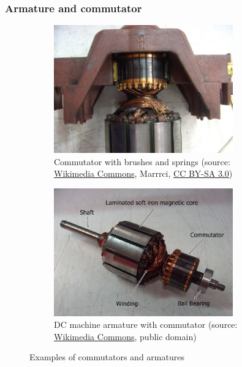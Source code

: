 \begin{frame}
	\frametitle{Armature and commutator}
    \begin{figure}
		\centering
		\begin{subfigure}[b]{0.49\textwidth}
			\centering
			\includegraphics[width=0.85\textwidth]{fig/lec03/Commutator_Universalmachine.jpg}
			\caption{Commutator with brushes and springs (source: \href{https://commons.wikimedia.org/wiki/File:Kommutator_eines_Universalmotor.JPGg}{Wikimedia Commons}, Marrrci, \href{https://creativecommons.org/licenses/by-sa/3.0/deed.en}{CC BY-SA 3.0})}
		\end{subfigure}
		\hfill
		\begin{subfigure}[b]{0.49\textwidth}
			\centering
			\includegraphics[width=0.85\textwidth]{fig/lec03/DC_armature_example.jpg}
			\caption{DC machine armature with commutator (source: \href{https://commons.wikimedia.org/wiki/File:Motor_rotor.jpg}{Wikimedia Commons}, public domain)}
		\end{subfigure}
		\caption{Examples of commutators and armatures} 
        \label{fig:Armature_and_commutator}
	\end{figure}
\end{frame}

